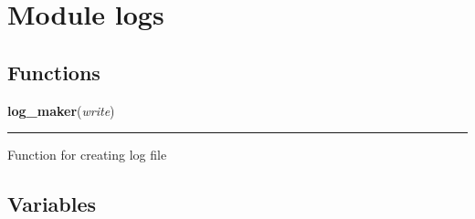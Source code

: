 %
%
%


\section{Module logs}

    \label{logs}


  \subsection{Functions}

    \label{logs:log_maker}

    \vspace{0.5ex}

\hspace{.8\funcindent}\begin{boxedminipage}{\funcwidth}

    \raggedright \textbf{log\_maker}(\textit{write})

    \vspace{-1.5ex}

    \rule{\textwidth}{0.5\fboxrule}
\setlength{\parskip}{2ex}
    Function for creating log file

\setlength{\parskip}{1ex}
    \end{boxedminipage}



  \subsection{Variables}


